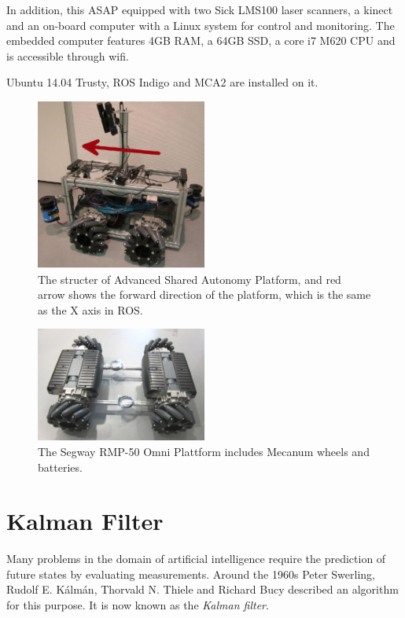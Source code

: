 In addition, this ASAP equipped with two Sick LMS100 laser scanners, a kinect and an on-board computer with a Linux system for control and monitoring. The embedded computer features 4GB RAM, a 64GB SSD, a core i7 M620 CPU and is accessible through wifi. 

Ubuntu 14.04 Trusty, ROS Indigo and MCA2 are installed on it.

\begin{figure}[ht]
      \centering
      \includegraphics[width=0.5\textwidth]{graphics/ASAP.png}
      \caption[Advanced Shared Autonomy Platform]{The structer of Advanced Shared Autonomy Platform, and red arrow shows the forward direction of the platform, which is the same as the X axis in ROS.}
      \label{ASAP}
   \end{figure}

\begin{figure}[ht]
      \centering
      \includegraphics[width=0.5\textwidth]{graphics/SegwayPlattform.png}
      \caption[Segway RMP-50 Omni Plattform]{The Segway RMP-50 Omni Plattform includes Mecanum wheels and batteries.}
      \label{Omni}
   \end{figure}

\section{Kalman Filter}
Many problems in the domain of artificial intelligence require the prediction of future states by evaluating measurements. Around the 1960s Peter Swerling, Rudolf E. Kálmán, Thorvald N. Thiele and Richard Bucy described an algorithm for this purpose. It is now known as the \textit{Kalman filter}.

